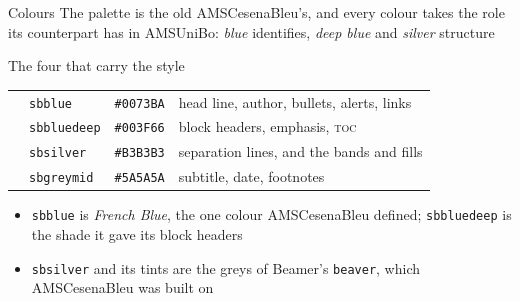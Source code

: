 \documentclass[presentation,cesena,apice]{beamer}\mode<presentation>{\usetheme{AMSSilverBlue}}
\newcommand{\swatch}[1]{\fcolorbox{sbgreyline}{#1}{\rule{0pt}{1.3ex}\rule{2.2ex}{0pt}}}
\begin{document}
\begin{frame}[c,fragile]{Colours}
%
The palette is the old \alert{AMSCesenaBleu}'s, and every colour takes the role its
counterpart has in \alert{AMSUniBo}: \textcolor{sbblue}{\textit{blue}} identifies,
\textcolor{sbbluedeep}{\textit{deep blue}} and \textcolor{sbgreymid}{\textit{silver}} structure
%
\begin{exampleblock}{The four that carry the style}
\begin{tabular}{@{}llll@{}}
\swatch{sbblue}     & \texttt{sbblue}     & \texttt{\#0073BA} & head line, author, bullets, alerts, links \\
\swatch{sbbluedeep} & \texttt{sbbluedeep} & \texttt{\#003F66} & block headers, emphasis, \textsc{toc} \\
\swatch{sbsilver}   & \texttt{sbsilver}   & \texttt{\#B3B3B3} & separation lines, and the bands and fills \\
\swatch{sbgreymid}  & \texttt{sbgreymid}  & \texttt{\#5A5A5A} & subtitle, date, footnotes \\
\end{tabular}
\end{exampleblock}
%
\begin{itemize}
	\item \texttt{sbblue} is \emph{French Blue}, the one colour \alert{AMSCesenaBleu} defined;
	      \texttt{sbbluedeep} is the shade it gave its block headers
	\item \texttt{sbsilver} and its tints are the greys of Beamer's \texttt{beaver}, which
	      \alert{AMSCesenaBleu} was built on
\end{itemize}
%
\end{frame}
\end{document}
